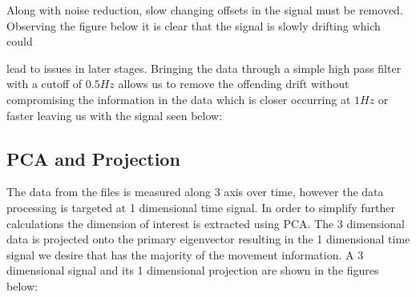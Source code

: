 \documentclass[10pt,twocolumn,letterpaper]{article}
\begin{document}
\begin{figure}[t]
\begin{center}
\fbox{\rule{0pt}{2in} \rule{0.9\linewidth}{0pt}}
   \caption{}
\end{center}
\end{figure}

Along with noise reduction, slow changing offsets in the signal must be removed.  Observing the figure below it is clear that the signal is slowly drifting which could

\begin{figure}[t]
\begin{center}
\fbox{\rule{0pt}{2in} \rule{0.9\linewidth}{0pt}}
   \caption{}
\end{center}
\end{figure}

lead to issues in later stages.  Bringing the data through a simple high pass filter with a cutoff of $0.5 Hz$ allows us to remove the offending drift without compromising the information in the data which is closer occurring at $1Hz$ or faster leaving us with the signal seen below:

\begin{figure}[t]
\begin{center}
\fbox{\rule{0pt}{2in} \rule{0.9\linewidth}{0pt}}
   \caption{}
\end{center}
\end{figure}

\subsection{PCA and Projection}

The data from the files is measured along 3 axis over time, however the data processing is targeted at 1 dimensional time signal.  In order to simplify further calculations the dimension of interest is extracted using PCA.  The 3 dimensional data is projected onto the primary eigenvector resulting in the 1 dimensional time signal we desire that has the majority of the movement information.  A 3 dimensional signal and its 1 dimensional projection are shown in the figures below:

\begin{figure}[t]
\begin{center}
\fbox{\rule{0pt}{2in} \rule{0.9\linewidth}{0pt}}
   \caption{}
\end{center}
\end{figure}
\end{document}
